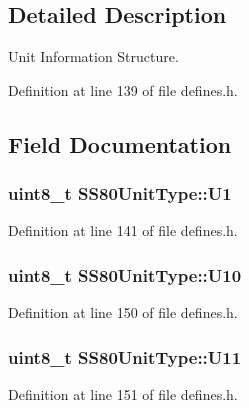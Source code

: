 \subsection{Detailed Description}
Unit Information Structure. 

Definition at line 139 of file defines.\+h.



\subsection{Field Documentation}
\subsubsection[{\texorpdfstring{U1}{U1}}]{\setlength{\rightskip}{0pt plus 5cm}uint8\+\_\+t S\+S80\+Unit\+Type\+::\+U1}\hypertarget{structSS80UnitType_ad7824d13f00e1e6893f57de54b3a2ac9}{}\label{structSS80UnitType_ad7824d13f00e1e6893f57de54b3a2ac9}


Definition at line 141 of file defines.\+h.

\subsubsection[{\texorpdfstring{U10}{U10}}]{\setlength{\rightskip}{0pt plus 5cm}uint8\+\_\+t S\+S80\+Unit\+Type\+::\+U10}\hypertarget{structSS80UnitType_a5fbd046709506b3f41c2df598a6373d6}{}\label{structSS80UnitType_a5fbd046709506b3f41c2df598a6373d6}


Definition at line 150 of file defines.\+h.

\subsubsection[{\texorpdfstring{U11}{U11}}]{\setlength{\rightskip}{0pt plus 5cm}uint8\+\_\+t S\+S80\+Unit\+Type\+::\+U11}\hypertarget{structSS80UnitType_aa7840672069613dfaea6b81b9c6d6d71}{}\label{structSS80UnitType_aa7840672069613dfaea6b81b9c6d6d71}


Definition at line 151 of file defines.\+h.

